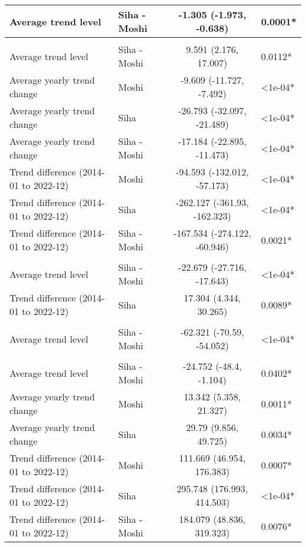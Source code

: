 \begin{longtable}{l|lcl}
\midrule\addlinespace[2.5pt]
Average trend level & Siha - Moshi & -1.305 (-1.973, -0.638) & 0.0001* \\ 
\midrule\addlinespace[2.5pt]
\multicolumn{4}{l}{Malaria} \\[2.5pt] 
\midrule\addlinespace[2.5pt]
Average trend level & Siha - Moshi & 9.591 (2.176, 17.007) & 0.0112* \\ 
Average yearly trend change & Moshi & -9.609 (-11.727, -7.492) & <1e-04* \\ 
Average yearly trend change & Siha & -26.793 (-32.097, -21.489) & <1e-04* \\ 
Average yearly trend change & Siha - Moshi & -17.184 (-22.895, -11.473) & <1e-04* \\ 
Trend difference (2014-01 to 2022-12) & Moshi & -94.593 (-132.012, -57.173) & <1e-04* \\ 
Trend difference (2014-01 to 2022-12) & Siha & -262.127 (-361.93, -162.323) & <1e-04* \\ 
Trend difference (2014-01 to 2022-12) & Siha - Moshi & -167.534 (-274.122, -60.946) & 0.0021* \\ 
\midrule\addlinespace[2.5pt]
\multicolumn{4}{l}{Neuroses} \\[2.5pt] 
\midrule\addlinespace[2.5pt]
Average trend level & Siha - Moshi & -22.679 (-27.716, -17.643) & <1e-04* \\ 
Trend difference (2014-01 to 2022-12) & Siha & 17.304 (4.344, 30.265) & 0.0089* \\ 
\midrule\addlinespace[2.5pt]
\multicolumn{4}{l}{Other Cardiovascular Diseases} \\[2.5pt] 
\midrule\addlinespace[2.5pt]
Average trend level & Siha - Moshi & -62.321 (-70.59, -54.052) & <1e-04* \\ 
\midrule\addlinespace[2.5pt]
\multicolumn{4}{l}{Peptic Ulcers} \\[2.5pt] 
\midrule\addlinespace[2.5pt]
Average trend level & Siha - Moshi & -24.752 (-48.4, -1.104) & 0.0402* \\ 
Average yearly trend change & Moshi & 13.342 (5.358, 21.327) & 0.0011* \\ 
Average yearly trend change & Siha & 29.79 (9.856, 49.725) & 0.0034* \\ 
Trend difference (2014-01 to 2022-12) & Moshi & 111.669 (46.954, 176.383) & 0.0007* \\ 
Trend difference (2014-01 to 2022-12) & Siha & 295.748 (176.993, 414.503) & <1e-04* \\ 
Trend difference (2014-01 to 2022-12) & Siha - Moshi & 184.079 (48.836, 319.323) & 0.0076* \\ 

\end{longtable}

